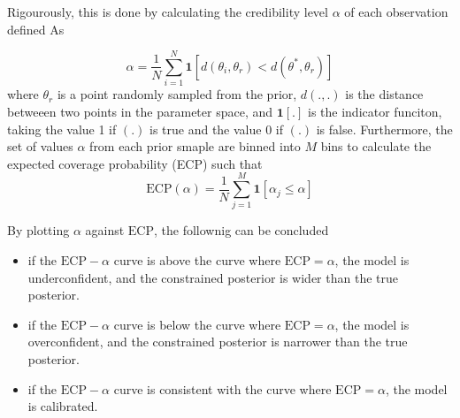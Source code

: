 Rigourously, this is done by calculating the credibility level $\alpha$ of each observation defined As

\begin{equation}
    \alpha = \frac{1}{N} \sum_{i = 1}^{N} \mathbf{1} \left[d(\theta_i , \theta_r) < d(\theta^{\ast} , \theta_r) \right]
\end{equation}
where $\theta_r$ is a point randomly sampled from the prior, $d(., .)$ is the distance betweeen two points in the parameter space, and $\mathbf{1}[.]$ is the indicator funciton, taking the value 1 if $(.)$ is true and the value 0 if $(.)$ is false. Furthermore, the set of values $\alpha$ from each prior smaple are binned into $M$ bins to calculate the expected coverage probability (ECP) such that
\begin{equation}
\mathrm{ECP}(\alpha) =  \frac{1}{N} \sum_{j = 1}^{M} \mathbf{1} \left[\alpha_j \leq \alpha  \right]
\end{equation}

By plotting $\alpha$ against $\mathrm{ECP}$, the follownig can be concluded
\begin{itemize}
    \item if the $\mathrm{ECP}-\alpha$ curve is above the curve where $\mathrm{ECP}= \alpha$, the model is underconfident, and the constrained posterior is wider than the true posterior. 
    \item if the $\mathrm{ECP}-\alpha$ curve is below the curve where $\mathrm{ECP}= \alpha$, the model is overconfident, and the constrained posterior is narrower than the true posterior. 
    \item if the $\mathrm{ECP}-\alpha$ curve is consistent with the curve where $\mathrm{ECP}= \alpha$, the model is calibrated.
\end{itemize}